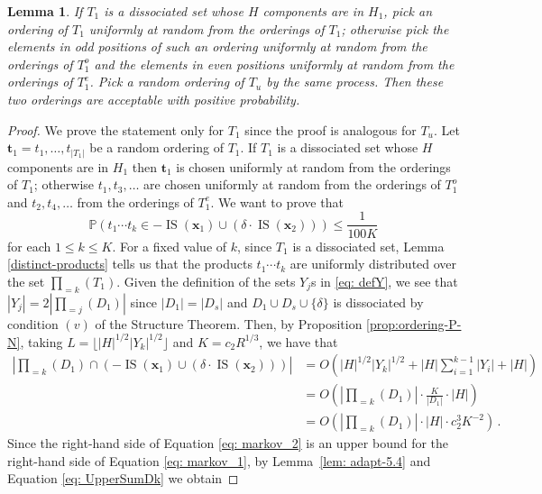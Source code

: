 \documentclass[11pt]{amsart}
\newtheorem{lemma}[theorem]{Lemma}
\theoremstyle{definition}
\DeclareMathOperator{\IS}{IS}
\begin{document}
\begin{lemma}\label{lem: adapt-6.1}
If $T_1$ is a dissociated set whose $H$ components are in $H_1$, pick an ordering of $T_1$ uniformly at random from the orderings of $T_1$; otherwise pick the elements in odd positions of such an ordering uniformly at random from the orderings of $T_1^o$ and the elements in even positions uniformly at random from the orderings of $T_1^e$. Pick a random ordering of $T_u$ by the same process. Then these two orderings are acceptable with positive probability.
\end{lemma}
\begin{proof}
    We prove the statement only for $T_1$ since the proof is analogous for $T_u$. Let $\mathbf{t}_1 = t_1, \ldots, t_{|T_1|}$ be a random ordering of $T_1$. If $T_1$ is a dissociated set whose $H$ components are in $H_1$ then $\mathbf{t}_1$ is chosen uniformly at random from the orderings of $T_1$; otherwise $t_1, t_3, \ldots$ are chosen uniformly at random from the orderings of $T_1^o$ and $t_2, t_4, \ldots$ from the orderings of $T_1^e$.  We want to prove that $$\mathbb{P}\left(t_1 \cdots t_k \in  -\IS(\mathbf{x}_1) \cup \left(\delta \cdot \IS(\mathbf{x}_2)\right) \right) \leq \frac{1}{100K}\,$$ 
    for each $1\leq k \leq K$. For a fixed value of $k$, since $T_1$ is a dissociated set, Lemma \ref{distinct-products} tells us that the products $t_1 \cdots t_k$ are uniformly distributed over the set $\prod_{=k} (T_1)$. Given the definition of the sets $Y_j$s in \eqref{eq: defY}, we see that $|Y_j| = 2 \left| \prod_{= j} (D_1) \right|$ since $|D_1| = |D_s|$ and $D_1\cup D_s\cup \{\delta\}$ is dissociated by condition $(v)$ of the Structure Theorem. Then, by Proposition \ref{prop:ordering-P-N}, taking $L=\lfloor |H|^{1/2}|Y_k|^{1/2} \rfloor$ and $K=c_2 R^{1/3}$, we have that
    \begin{align}\label{eq: UpperSumDk}
    \nonumber
    \left| \prod_{=k} (D_1) \cap  \left(-\IS(\mathbf{x}_1) \cup \left(\delta \cdot \IS(\mathbf{x}_2)\right)\right)\right| &= O\left( |H|^{1/2}|Y_k|^{1/2} + |H|\sum_{i=1}^{k-1} |Y_i| + |H|\right) \\ \nonumber &= O\left( \left| \prod_{=k} (D_1) \right| \cdot \frac{K}{|D_1|} \cdot |H| \right) \\ &= O\left(\left| \prod_{=k} (D_1)\right| \cdot |H| \cdot c_2^3 K^{-2} \right)\,.
\end{align}
Since the right-hand side of Equation \eqref{eq: markov_2} is an upper bound for the right-hand side of Equation \eqref{eq: markov_1}, by Lemma~\ref{lem: adapt-5.4} and Equation \eqref{eq: UpperSumDk} we obtain

\end{proof}
\end{document}
